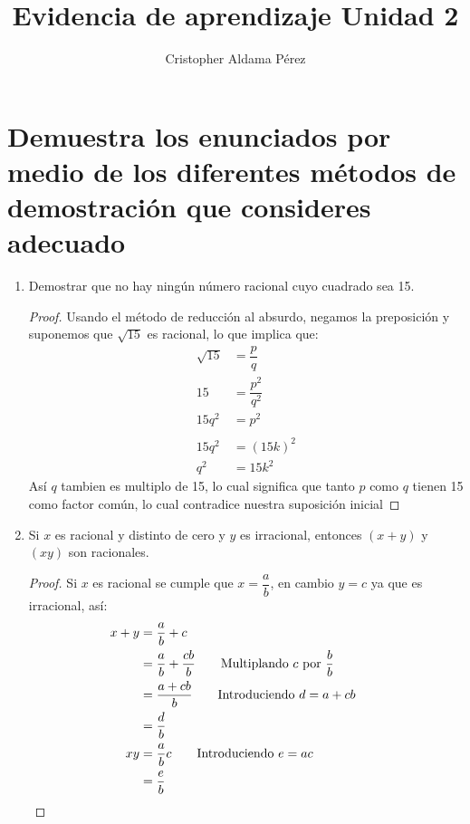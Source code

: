 \documentclass[a4paper,10pt]{article}
\title{Evidencia de aprendizaje Unidad 2}
\author{Cristopher Aldama Pérez}
\begin{document}
\maketitle

\section{Demuestra los enunciados por medio de los diferentes métodos de demostración que consideres adecuado}

\begin{enumerate}
 \item Demostrar que no hay ningún número racional cuyo cuadrado sea 15.
   \begin{proof}
    Usando el método de reducción al absurdo, negamos la preposición y suponemos que $\sqrt{15}$ es racional, lo que implica que:
      \begin{align*}
        \sqrt{15} &= \dfrac{p}{q}
        \\ 15 &= \dfrac{p^2}{q^2}
        \\ 15q^2 &= p^2
        \\ \tag*{Así $p$ es un multiplo de 15 por lo que puede ser escrito como: $p=15k$}
        \\ 15q^2 &= (15k)^2
        \\ q^2 &= 15k^2
      \end{align*}
      Así $q$ tambien es multiplo de 15, lo cual significa que tanto $p$ como $q$ tienen 15 como factor común, lo cual contradice nuestra suposición inicial
   \end{proof}
   
  \item Si $x$ es racional y distinto de cero y $y$ es irracional, entonces $(x + y)$ y $(x y)$ son racionales.
  \begin {proof}
  Si $x$ es racional se cumple que $x = \dfrac{a}{b}$, en cambio $y = c$ ya que es irracional, así:
    \begin{align*}
     x + y &= \dfrac{a}{b} + c
     \\ &= \dfrac{a}{b} + \dfrac{cb}{b} \tag*{Multiplando $c$ por $\dfrac{b}{b}$}
     \\ &= \dfrac{a + cb}{b}            \tag*{Introduciendo $d = a + cb$}
     \\ &= \dfrac{d}{b}
     \\ xy &= \dfrac{a}{b} c            \tag*{Introduciendo $e = ac$}
     \\ &= \dfrac{e}{b}                 &&\qedhere
    \end{align*}
  \end {proof}
  

\end{enumerate}
\end{document}
